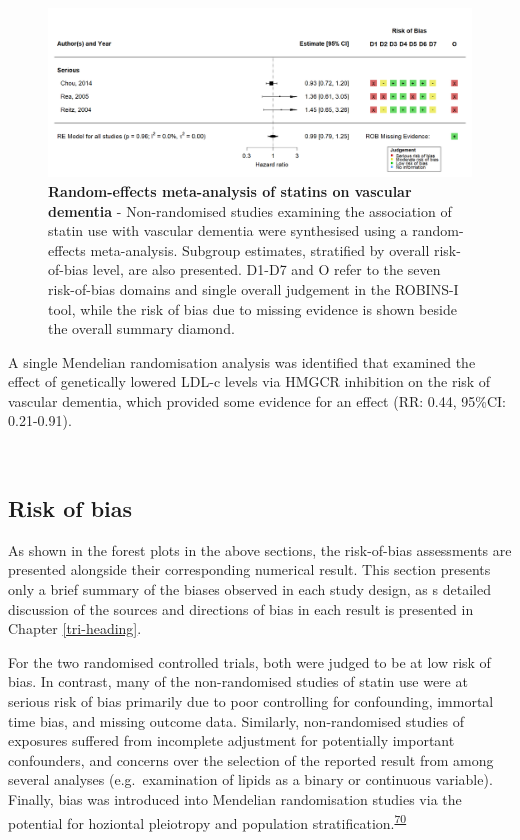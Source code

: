 \documentclass[a4paper, twoside]{templates/ociamthesis}
\begin{document}
\begin{figure}[H]
\includegraphics[width=1\linewidth]{figures/sys-rev/fp_obs_Statin-Ever_VaD} \caption[Random-effects meta-analysis of statins on vascular dementia]{\textbf{Random-effects meta-analysis of statins on vascular dementia} - Non-randomised studies examining the association of statin use with vascular dementia were synthesised using a random-effects meta-analysis. Subgroup estimates, stratified by overall risk-of-bias level, are also presented. D1-D7 and O refer to the seven risk-of-bias domains and single overall judgement in the ROBINS-I tool, while the risk of bias due to missing evidence is shown beside the overall summary diamond.}\label{fig:obsStatinVaDFig}
\end{figure}

A single Mendelian randomisation analysis was identified that examined the effect of genetically lowered LDL-c levels via HMGCR inhibition on the risk of vascular dementia, which provided some evidence for an effect (RR: 0.44, 95\%CI: 0.21-0.91).

~

\hypertarget{risk-of-bias-res}{%
\subsection{Risk of bias}\label{risk-of-bias-res}}

As shown in the forest plots in the above sections, the risk-of-bias assessments are presented alongside their corresponding numerical result. This section presents only a brief summary of the biases observed in each study design, as s detailed discussion of the sources and directions of bias in each result is presented in Chapter \ref{tri-heading}.

For the two randomised controlled trials, both were judged to be at low risk of bias. In contrast, many of the non-randomised studies of statin use were at serious risk of bias primarily due to poor controlling for confounding, immortal time bias, and missing outcome data. Similarly, non-randomised studies of exposures suffered from incomplete adjustment for potentially important confounders, and concerns over the selection of the reported result from among several analyses (e.g.~examination of lipids as a binary or continuous variable). Finally, bias was introduced into Mendelian randomisation studies via the potential for hoziontal pleiotropy and population stratification.\textsuperscript{\protect\hyperlink{ref-davies2018}{70}}
\end{document}
